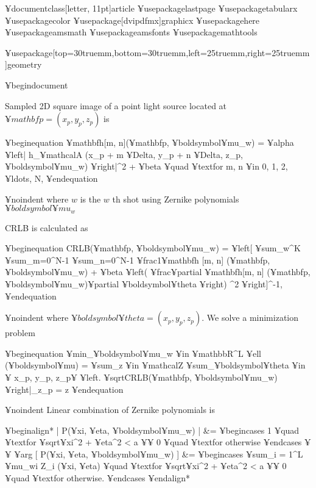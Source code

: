 

¥documentclass[letter, 11pt]{article}
¥usepackage{lastpage}
¥usepackage{tabularx} 
¥usepackage{color}
¥usepackage[dvipdfmx]{graphicx}
¥usepackage{here}
¥usepackage{amsmath}
¥usepackage{amsfonts}
¥usepackage{mathtools}


¥usepackage[top=30truemm,bottom=30truemm,left=25truemm,right=25truemm]{geometry}




¥begin{document}

Sampled 2D square image of a point light source located at $¥mathbf{p} = (x_{p}, y_{p}, z_{p})$ is

¥begin{equation}
	¥mathbf{h}[m, n](¥mathbf{p}, ¥boldsymbol{¥mu}_{w}) = ¥alpha ¥left|   h_{¥mathcal{A}} (x_{p} + m ¥Delta,  y_{p} + n ¥Delta, z_{p}, 
	¥boldsymbol{¥mu}_{w})    ¥right|^{2} + ¥beta ¥quad  ¥text{for } m, n ¥in {0, 1, 2, ¥ldots, N},
¥end{equation}

¥noindent where $w$ is the $w$ th  shot using Zernike polynomials $¥boldsymbol{¥mu}_{w}$

CRLB is calculated as

¥begin{equation}
	CRLB(¥mathbf{p}, ¥boldsymbol{¥mu}_{w}) = ¥left[  ¥sum_{w}^{K}  ¥sum_{m=0}^{N-1} ¥sum_{n=0}^{N-1}
	¥frac{1}{¥mathbf{h} [m, n] (¥mathbf{p}, ¥boldsymbol{¥mu}_{w}) + ¥beta}	    
	¥left(  ¥frac{¥partial  ¥mathbf{h}[m, n] (¥mathbf{p}, ¥boldsymbol{¥mu}_{w})}{¥partial ¥boldsymbol{¥theta}} ¥right) ^{2}
	¥right]^{-1},
¥end{equation}

¥noindent
where $¥boldsymbol{¥theta} = (x_{p}, y_{p}, z_{p})$. 
We solve a minimization problem

¥begin{equation}
	¥min_{¥boldsymbol{¥mu}_{w} ¥in ¥mathbb{R}^{L}} ¥ell (¥boldsymbol{¥mu}) = 
	¥sum_{z ¥in ¥mathcal{Z}} ¥sum_{¥boldsymbol{¥theta} ¥in ¥{ x_{p}, y_{p}, z_{p}¥} }
	¥left. ¥sqrt{CRLB(¥mathbf{p}, ¥boldsymbol{¥mu}_{w})}
	¥right|_{z_{p} = z}
¥end{equation}

¥noindent
Linear combination of Zernike polynomials is

¥begin{align*}
	| P(¥xi, ¥eta, ¥boldsymbol{¥mu}_{w}) | &=
		¥begin{cases}
			1 ¥quad ¥text{for } ¥sqrt{¥xi^{2} + ¥eta^{2}} < a ¥¥
			0 ¥quad ¥text{for otherwise}
	        ¥end{cases} ¥¥
	        ¥arg [ P(¥xi, ¥eta, ¥boldsymbol{¥mu}_{w}) ] &=
		        ¥begin{cases}
	        		¥sum_{i = 1}^{L} ¥mu_{wi} Z_{i} (¥xi, ¥eta) ¥quad ¥text{for } ¥sqrt{¥xi^{2} + ¥eta^{2}} < a ¥¥
			0 ¥quad ¥text{for otherwise}.
	        ¥end{cases}
¥end{align*}

